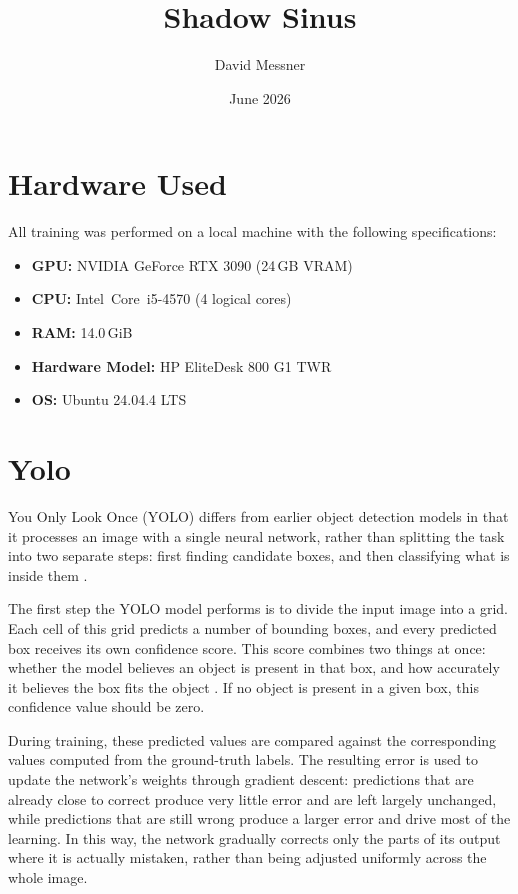 \documentclass{article}
\title{Shadow Sinus}
\author{David Messner}
\date{June 2026}
\begin{document}
\maketitle\maketitle
\tableofcontents
\section{Hardware Used}
All training was performed on a local machine with the following
specifications:

\begin{itemize}
	\item \textbf{GPU:} NVIDIA GeForce RTX 3090 (24\,GB VRAM)
	\item \textbf{CPU:} Intel\textregistered\ Core\texttrademark\ i5-4570
	      (4 logical cores)
	\item \textbf{RAM:} 14.0\,GiB
	\item \textbf{Hardware Model:} HP EliteDesk 800 G1 TWR
	\item \textbf{OS:} Ubuntu 24.04.4 LTS
\end{itemize}

\section{Yolo}
You Only Look Once (YOLO) differs from earlier object detection models in
that it processes an image with a single neural network, rather than
splitting the task into two separate steps: first finding candidate boxes,
and then classifying what is inside them .

The first step the YOLO model performs is to divide the input image into a
grid. Each cell of this grid predicts a number of bounding boxes, and every
predicted box receives its own confidence score. This score combines two
things at once: whether the model believes an object is present in that
box, and how accurately it believes the box fits the object
. If no object is present in a given box, this
confidence value should be zero.

During training, these predicted values are compared against the
corresponding values computed from the ground-truth labels. The resulting
error is used to update the network's weights through gradient descent:
predictions that are already close to correct produce very little error
and are left largely unchanged, while predictions that are still wrong
produce a larger error and drive most of the learning. In this way, the
network gradually corrects only the parts of its output where it is
actually mistaken, rather than being adjusted uniformly across the whole
image.
\end{document}
